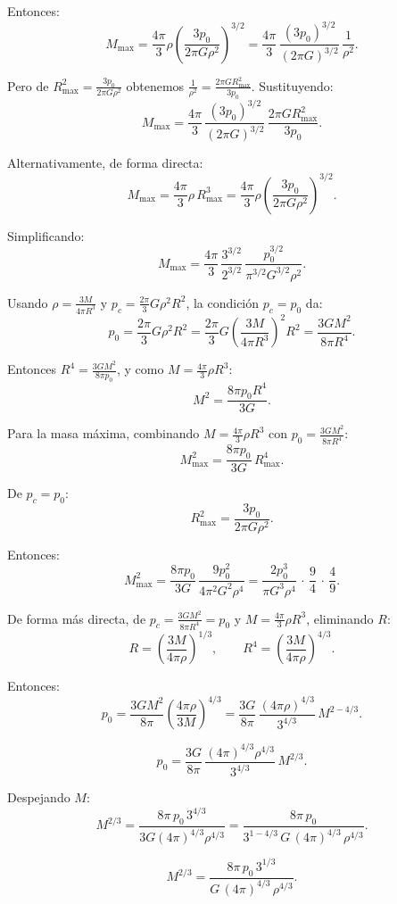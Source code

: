 Entonces:
$$
M_{\text{max}} = \frac{4\pi}{3}\rho\left(\frac{3p_0}{2\pi G\rho^2}\right)^{3/2} = \frac{4\pi}{3}\,\frac{(3p_0)^{3/2}}{(2\pi G)^{3/2}}\,\frac{1}{\rho^2}.
$$

Pero de $R_{\text{max}}^2 = \frac{3p_0}{2\pi G\rho^2}$ obtenemos $\frac{1}{\rho^2} = \frac{2\pi G R_{\text{max}}^2}{3p_0}$. Sustituyendo:
$$
M_{\text{max}} = \frac{4\pi}{3}\,\frac{(3p_0)^{3/2}}{(2\pi G)^{3/2}}\,\frac{2\pi G R_{\text{max}}^2}{3p_0}.
$$

Alternativamente, de forma directa:
$$
M_{\text{max}} = \frac{4\pi}{3}\rho\,R_{\text{max}}^3 = \frac{4\pi}{3}\rho\left(\frac{3p_0}{2\pi G\rho^2}\right)^{3/2}.
$$

Simplificando:
$$
M_{\text{max}} = \frac{4\pi}{3}\,\frac{3^{3/2}}{2^{3/2}}\,\frac{p_0^{3/2}}{\pi^{3/2}G^{3/2}\rho^2}.
$$

Usando $\rho = \frac{3M}{4\pi R^3}$ y $p_c = \frac{2\pi}{3}G\rho^2 R^2$, la condición $p_c = p_0$ da:
$$
p_0 = \frac{2\pi}{3}G\rho^2 R^2 = \frac{2\pi}{3}G\left(\frac{3M}{4\pi R^3}\right)^2 R^2 = \frac{3GM^2}{8\pi R^4}.
$$

Entonces $R^4 = \frac{3GM^2}{8\pi p_0}$, y como $M = \frac{4\pi}{3}\rho R^3$:
$$
M^2 = \frac{8\pi p_0 R^4}{3G}.
$$

Para la masa máxima, combinando $M = \frac{4\pi}{3}\rho R^3$ con $p_0 = \frac{3GM^2}{8\pi R^4}$:
$$
M_{\text{max}}^2 = \frac{8\pi p_0}{3G}\,R_{\text{max}}^4.
$$

De $p_c = p_0$:
$$
R_{\text{max}}^2 = \frac{3p_0}{2\pi G\rho^2}.
$$

Entonces:
$$
M_{\text{max}}^2 = \frac{8\pi p_0}{3G}\,\frac{9p_0^2}{4\pi^2 G^2\rho^4} = \frac{2p_0^3}{\pi G^3\rho^4}\,\cdot\,\frac{9}{4}\,\cdot\,\frac{4}{9}.
$$

De forma más directa, de $p_c = \frac{3GM^2}{8\pi R^4} = p_0$ y $M = \frac{4\pi}{3}\rho R^3$, eliminando $R$:
$$
R = \left(\frac{3M}{4\pi\rho}\right)^{1/3}, \qquad R^4 = \left(\frac{3M}{4\pi\rho}\right)^{4/3}.
$$

Entonces:
$$
p_0 = \frac{3GM^2}{8\pi}\left(\frac{4\pi\rho}{3M}\right)^{4/3} = \frac{3G}{8\pi}\,\frac{(4\pi\rho)^{4/3}}{3^{4/3}}\,M^{2-4/3}.
$$

$$
p_0 = \frac{3G}{8\pi}\,\frac{(4\pi)^{4/3}\rho^{4/3}}{3^{4/3}}\,M^{2/3}.
$$

Despejando $M$:
$$
M^{2/3} = \frac{8\pi\, p_0\, 3^{4/3}}{3G(4\pi)^{4/3}\rho^{4/3}} = \frac{8\pi\, p_0}{3^{1-4/3}\,G\,(4\pi)^{4/3}\,\rho^{4/3}}.
$$

$$
M^{2/3} = \frac{8\pi\, p_0\, 3^{1/3}}{G\,(4\pi)^{4/3}\,\rho^{4/3}}.
$$

